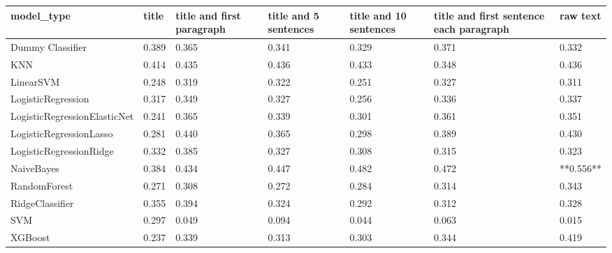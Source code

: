 \begin{tabular}{lllllll}
\toprule
                  model\_type & title & title and first paragraph & title and 5 sentences & title and 10 sentences & title and first sentence each paragraph &  raw text \\
\midrule
            Dummy Classifier & 0.389 &                     0.365 &                 0.341 &                  0.329 &                                   0.371 &     0.332 \\
                         KNN & 0.414 &                     0.435 &                 0.436 &                  0.433 &                                   0.348 &     0.436 \\
                   LinearSVM & 0.248 &                     0.319 &                 0.322 &                  0.251 &                                   0.327 &     0.311 \\
          LogisticRegression & 0.317 &                     0.349 &                 0.327 &                  0.256 &                                   0.336 &     0.337 \\
LogisticRegressionElasticNet & 0.241 &                     0.365 &                 0.339 &                  0.301 &                                   0.361 &     0.351 \\
     LogisticRegressionLasso & 0.281 &                     0.440 &                 0.365 &                  0.298 &                                   0.389 &     0.430 \\
     LogisticRegressionRidge & 0.332 &                     0.385 &                 0.327 &                  0.308 &                                   0.315 &     0.323 \\
                  NaiveBayes & 0.384 &                     0.434 &                 0.447 &                  0.482 &                                   0.472 & **0.556** \\
                RandomForest & 0.271 &                     0.308 &                 0.272 &                  0.284 &                                   0.314 &     0.343 \\
             RidgeClassifier & 0.355 &                     0.394 &                 0.324 &                  0.292 &                                   0.312 &     0.328 \\
                         SVM & 0.297 &                     0.049 &                 0.094 &                  0.044 &                                   0.063 &     0.015 \\
                     XGBoost & 0.237 &                     0.339 &                 0.313 &                  0.303 &                                   0.344 &     0.419 \\
\bottomrule
\end{tabular}
